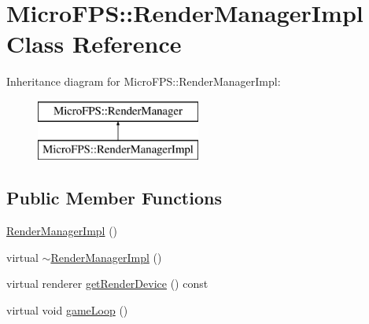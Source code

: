 \hypertarget{class_micro_f_p_s_1_1_render_manager_impl}{
\section{MicroFPS::RenderManagerImpl Class Reference}
\label{de/d41/class_micro_f_p_s_1_1_render_manager_impl}
}
Inheritance diagram for MicroFPS::RenderManagerImpl:\begin{figure}[H]
\begin{center}
\leavevmode
\includegraphics[height=2.000000cm]{de/d41/class_micro_f_p_s_1_1_render_manager_impl}
\end{center}
\end{figure}
\subsection*{Public Member Functions}
\begin{DoxyCompactItemize}
\item 
\hyperlink{class_micro_f_p_s_1_1_render_manager_impl_a3fe0b36c083e52153d4118c7e68ec842}{RenderManagerImpl} ()
\item 
virtual \hyperlink{class_micro_f_p_s_1_1_render_manager_impl_a4e64d05f033e969f4d73369ff85ffabe}{$\sim$RenderManagerImpl} ()
\item 
virtual renderer \hyperlink{class_micro_f_p_s_1_1_render_manager_impl_ae20d62f6586e0b9fd2513d7b880f65fc}{getRenderDevice} () const 
\item 
virtual void \hyperlink{class_micro_f_p_s_1_1_render_manager_impl_ae6193ed34540f294a97cd16d15f41ca4}{gameLoop} ()
\end{DoxyCompactItemize}


